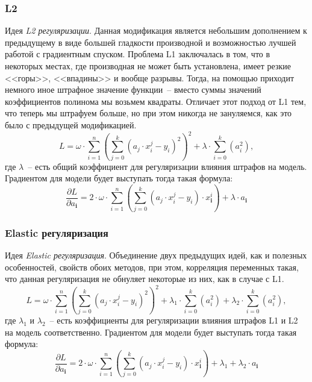 \documentclass[12pt, a4paper, oneside, final]{article}
\begin{document}
	\subsubsection*{L2}
	Идея \textit{L2 регуляризации}.
	Данная модификация является небольшим дополнением к предыдущему в виде большей гладкости производной и возможностью лучшей работой с градиентным спуском.
	Проблема L1 заключалась в том, что в некоторых местах, где производная не может быть установлена, имеет резкие <<горы>>, <<впадины>> и вообще разрывы.
	Тогда, на помощью приходит немного иное штрафное значение функции~-- вместо суммы значений коэффициентов полинома мы возьмем квадраты.
	Отличает этот подход от L1 тем, что теперь мы штрафуем больше, но при этом никогда не зануляемся, как это было с предыдущей модификацией.
	\[
		L = \omega \cdot \sum\limits_{i = 1}^{n}{\left(\sum\limits_{j = 0}^{k}{\left(a_{j} \cdot x_{i}^{j} - y_{i}\right)^{2}}\right)^{2}} + \lambda \cdot \sum\limits_{i = 0}^{k}{\left(a_{i}^{2}\right)},
	\]
	где $\lambda$~-- есть общий коэффициент для регуляризации влияния штрафов на модель.
	Градиентом для модели будет выступать тогда такая формула:
	\[
		\dfrac{\partial{L}}{\partial{a_{\mathbf{i}}}} = 2 \cdot \omega \cdot \sum\limits_{i = 1}^{n}{\left(\sum\limits_{j = 0}^{k}{\left(a_{j} \cdot x_{i}^{j} - y_{i}\right) \cdot x^{i}_{\mathbf{i}}}\right)} + \lambda \cdot a_{\mathbf{i}}
	\]
	\subsubsection*{Elastic регуляризация}
	Идея \textit{Elastic регуляризация}.
	Объединение двух предыдущих идей, как и полезных особенностей, свойств обоих методов, при этом, корреляция переменных такая, что данная регуляризация не обнуляет некоторые из них, как в случае с L1.
	\[
		L = \omega \cdot \sum\limits_{i = 1}^{n}{\left(\sum\limits_{j = 0}^{k}{\left(a_{j} \cdot x_{i}^{j} - y_{i}\right)^{2}}\right)^{2}} + \lambda_{1} \cdot \sum\limits_{i = 0}^{k}{\left(a_{i}^{2}\right)} + \lambda_{2} \cdot \sum\limits_{i = 0}^{k}{\left(a_{i}^{2}\right)},
	\]
	где $\lambda_{1}$ и $\lambda_{2}$~-- есть коэффициенты для регуляризации влияния штрафов L1 и L2 на модель соответственно.
	Градиентом для модели будет выступать тогда такая формула:
	\[
		\dfrac{\partial{L}}{\partial{a_{\mathbf{i}}}} = 2 \cdot \omega \cdot \sum\limits_{i = 1}^{n}{\left(\sum\limits_{j = 0}^{k}{\left(a_{j} \cdot x_{i}^{j} - y_{i}\right) \cdot x^{i}_{\mathbf{i}}}\right)} + \lambda_{1} + \lambda_{2} \cdot a_{\mathbf{i}}
	\]
\end{document}

